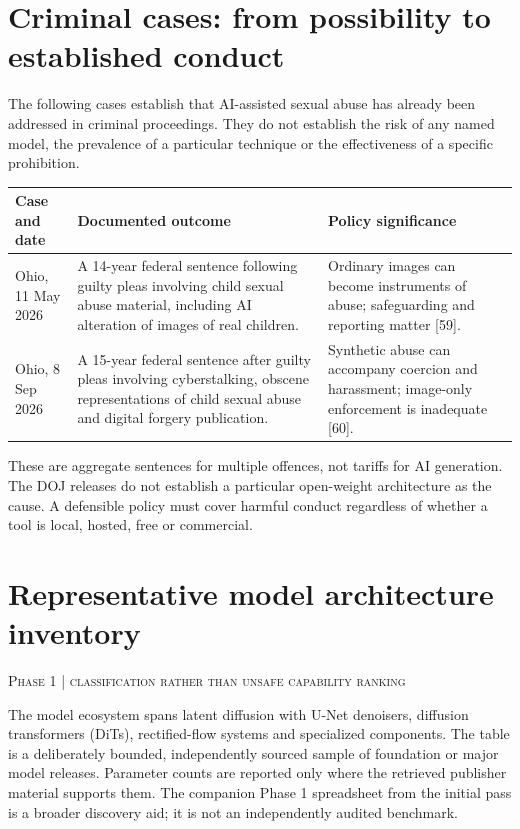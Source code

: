 \documentclass[10pt,a4paper]{article}
\newcommand{\sect}[2]{\Needspace{6\baselineskip}\section{#1}\textcolor{muted}{\small\textsc{#2}}\par\vspace{2mm}}
\begin{document}
\section{Criminal cases: from possibility to established conduct}
The following cases establish that AI-assisted sexual abuse has already been addressed in criminal proceedings. They do not establish the risk of any named model, the prevalence of a particular technique or the effectiveness of a specific prohibition.

\begin{center}\small\begin{tabularx}{\linewidth}{@{}>{\RaggedRight\arraybackslash}p{.21\linewidth}YY@{}}\toprule
\textbf{Case and date} & \textbf{Documented outcome} & \textbf{Policy significance}\\\midrule
Ohio, 11 May 2026 & A 14-year federal sentence following guilty pleas involving child sexual abuse material, including AI alteration of images of real children. & Ordinary images can become instruments of abuse; safeguarding and reporting matter [59].\\
Ohio, 8 Sep 2026 & A 15-year federal sentence after guilty pleas involving cyberstalking, obscene representations of child sexual abuse and digital forgery publication. & Synthetic abuse can accompany coercion and harassment; image-only enforcement is inadequate [60].\\\bottomrule\end{tabularx}\end{center}

These are aggregate sentences for multiple offences, not tariffs for AI generation. The DOJ releases do not establish a particular open-weight architecture as the cause. A defensible policy must cover harmful conduct regardless of whether a tool is local, hosted, free or commercial. \cite{dojohio,dojstalk}


\sect{Representative model architecture inventory}{Phase 1 | classification rather than unsafe capability ranking}

The model ecosystem spans latent diffusion with U-Net denoisers, diffusion transformers (DiTs), rectified-flow systems and specialized components. The table is a deliberately bounded, independently sourced sample of foundation or major model releases. Parameter counts are reported only where the retrieved publisher material supports them. The companion Phase 1 spreadsheet from the initial pass is a broader discovery aid; it is not an independently audited benchmark.
\end{document}
